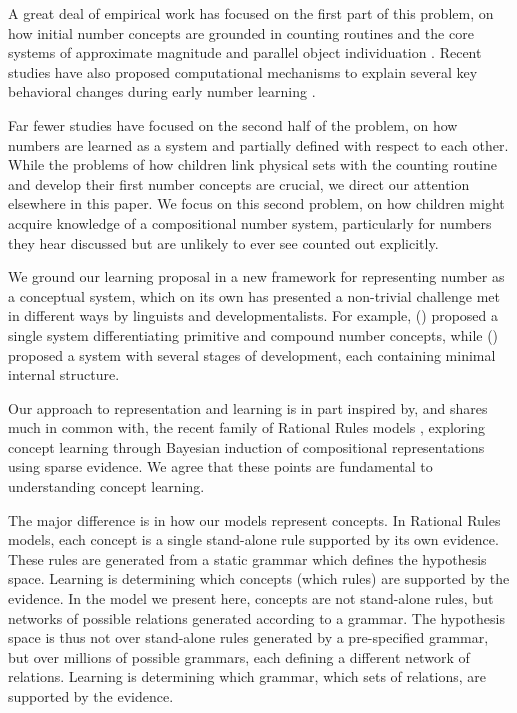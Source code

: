 \documentclass[10pt,letterpaper]{article}
\begin{document}
A great deal of empirical work has focused on the first part of this
problem, on how initial number concepts are grounded in counting
routines and the core systems of approximate magnitude and parallel
object individuation
\citep{Car2009,dehaene2011number,feigenson2004core}. Recent studies
have also proposed computational mechanisms to explain several key
behavioral changes during early number learning
\citep{PianGoodTen2012}.

Far fewer studies have focused on the second half of the problem, on
how numbers are learned as a system and partially defined with respect
to each other. While the problems of how children link physical sets
with the counting routine and develop their first number concepts are
crucial, we direct our attention elsewhere in this paper. We focus on
this second problem, on how children might acquire knowledge of a
compositional number system, particularly for numbers they hear
discussed but are unlikely to ever see counted out explicitly.

We ground our learning proposal in a new framework for representing
number as a conceptual system, which on its own has presented a
non-trivial challenge met in different ways by linguists and
developmentalists. For example, \citeauthor{hurford1975linguistic}
(\citeyear{hurford1975linguistic}) proposed a single system
differentiating primitive and compound number concepts, while
\citeauthor{siegler1982development}
(\citeyear{siegler1982development}) proposed a system with several
stages of development, each containing minimal internal structure.

Our approach to representation and learning is in part inspired by,
and shares much in common with, the recent family of Rational Rules
models
\citep{goodman2008rational,T.D.Ullman:2012:1b1b6,PianGoodTen2012},
exploring concept learning through Bayesian induction of compositional
representations using sparse evidence. We agree that these points are
fundamental to understanding concept learning.

The major difference is in how our models represent concepts. In
Rational Rules models, each concept is a single stand-alone rule
supported by its own evidence. These rules are generated from a static
grammar which defines the hypothesis space. Learning is determining
which concepts (which rules) are supported by the evidence. In the
model we present here, concepts are not stand-alone rules, but
networks of possible relations generated according to a grammar. The
hypothesis space is thus not over stand-alone rules generated by a
pre-specified grammar, but over millions of possible grammars, each
defining a different network of relations. Learning is determining
which grammar, which sets of relations, are supported by the evidence.
\end{document}
